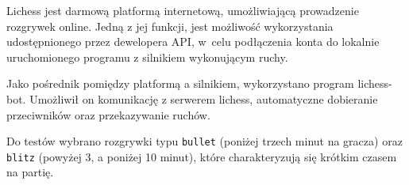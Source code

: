 
Lichess jest darmową platformą internetową, umożliwiającą prowadzenie rozgrywek online.
Jedną z jej funkcji, jest możliwość wykorzystania udostępnionego przez dewelopera API, w~celu podłączenia konta do lokalnie uruchomionego programu z silnikiem wykonującym ruchy.

Jako pośrednik pomiędzy platformą a silnikiem, wykorzystano program lichess-bot. \cite*{lichess-bot-docs}
Umożliwił on komunikację z serwerem lichess, automatyczne dobieranie przeciwników oraz przekazywanie ruchów.

Do testów wybrano rozgrywki typu \texttt{bullet} (poniżej trzech minut na gracza) oraz \texttt{blitz} (powyżej 3, a poniżej 10 minut), które charakteryzują się krótkim czasem na partię.
